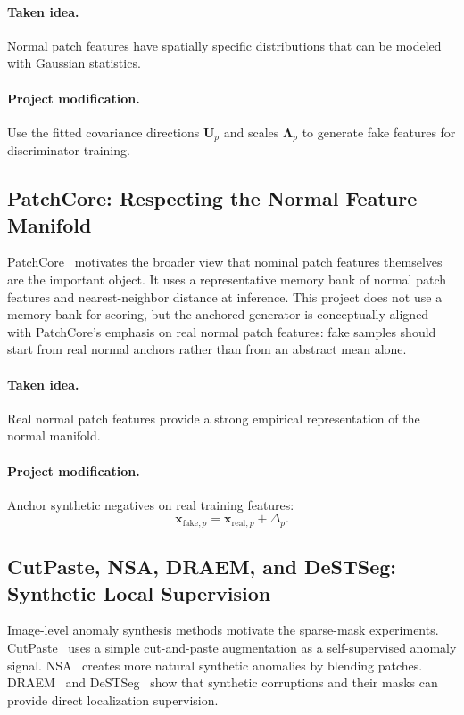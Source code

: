 \documentclass[11pt]{article}
\newcommand{\Up}{\mathbf{U}_p}
\newcommand{\Lp}{\boldsymbol{\Lambda}_p}
\begin{document}
\paragraph{Taken idea.}
Normal patch features have spatially specific distributions that can be modeled
with Gaussian statistics.

\paragraph{Project modification.}
Use the fitted covariance directions $\Up$ and scales $\Lp$ to generate fake
features for discriminator training.

\subsection{PatchCore: Respecting the Normal Feature Manifold}

PatchCore~\cite{patchcore} motivates the broader view that nominal patch
features themselves are the important object. It uses a representative memory
bank of normal patch features and nearest-neighbor distance at inference. This
project does not use a memory bank for scoring, but the anchored generator is
conceptually aligned with PatchCore's emphasis on real normal patch features:
fake samples should start from real normal anchors rather than from an abstract
mean alone.

\paragraph{Taken idea.}
Real normal patch features provide a strong empirical representation of the
normal manifold.

\paragraph{Project modification.}
Anchor synthetic negatives on real training features:
\[
  \mathbf{x}_{\mathrm{fake},p}
  =
  \mathbf{x}_{\mathrm{real},p} + \Delta_p.
\]

\subsection{CutPaste, NSA, DRAEM, and DeSTSeg: Synthetic Local Supervision}

Image-level anomaly synthesis methods motivate the sparse-mask experiments.
CutPaste~\cite{cutpaste} uses a simple cut-and-paste augmentation as a
self-supervised anomaly signal. NSA~\cite{nsa} creates more natural synthetic
anomalies by blending patches. DRAEM~\cite{draem} and DeSTSeg~\cite{destseg}
show that synthetic corruptions and their masks can provide direct localization
supervision.
\end{document}
